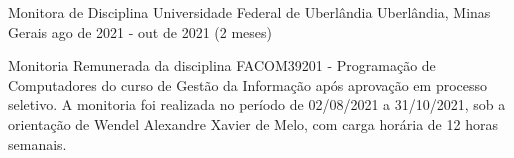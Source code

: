 \cventry
    {Monitora de Disciplina} %
    {Universidade Federal de Uberlândia} %
    {Uberlândia, Minas Gerais} %
    {ago de 2021 - out de 2021 (2 meses)} %
    {
        \begin{cvitems} %
            \item {Monitoria Remunerada da disciplina FACOM39201 - Programação de Computadores do curso de Gestão da Informação após aprovação em processo seletivo. A monitoria foi realizada no período de 02/08/2021 a 31/10/2021, sob a orientação de Wendel Alexandre Xavier de Melo, com carga horária de 12 horas semanais.}
        \end{cvitems}
    }